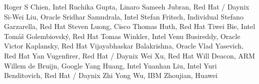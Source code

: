 Roger S Chien,	Intel	\newline
Ruchika Gupta, Linaro \newline
Sameeh Jubran,	Red Hat / Daynix	\newline
Si-Wei Liu,	Oracle	\newline
Sridhar Samudrala,	Intel	\newline
Stefan Fritsch,	Individual \newline
Stefano Garzarella,	Red Hat	\newline
Steven Luong,	Cisco	\newline
Thomas Huth,	Red Hat	\newline
Tiwei Bie,	Intel	\newline
Tomáš Golembiovský,	Red Hat	\newline
Tomas Winkler, Intel \newline
Venu Busireddy,	Oracle	\newline
Victor Kaplansky,	Red Hat	\newline
Vijayabhaskar Balakrishna,	Oracle	\newline
Vlad Yasevich,	Red Hat	\newline
Yan Vugenfirer, Red Hat / Daynix	\newline
Wei Xu,	Red Hat	\newline
Will Deacon,	ARM	\newline
Willem de Bruijn,	Google	\newline
Yang Huang, Intel \newline
Yuanhan Liu,	Intel	\newline
Yuri Benditovich,	Red Hat / Daynix	\newline
Zhi Yong Wu,	IBM	\newline
Zhoujian,	Huawei	\newline
